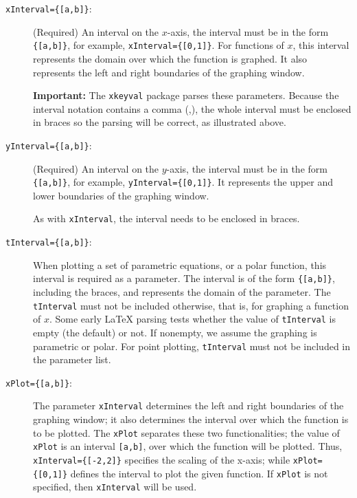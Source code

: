 \documentclass{article}
\def\darg#1{\{#1\}}
\begin{document}
\begin{description}
\begin{description}
    \item [\texttt{xInterval=\darg{[a,b]}}:] (Required) An interval on the $x$-axis, the
        interval must be in the form \verb!{[a,b]}!, for example,
        \texttt{xInterval=\darg{[0,1]}}. For functions of $x$, this interval
        represents the domain over which the function is graphed. It
        also represents the left and right boundaries of the graphing
        window.

        \textbf{Important:} The \texttt{xkeyval} package
        parses these parameters. Because the interval notation
        contains a comma (,), the whole interval must be enclosed in
        braces so the parsing will be correct, as illustrated above.

    \item [\texttt{yInterval=\darg{[a,b]}}:] (Required) An interval on the $y$-axis, the
        interval must be in the form \verb!{[a,b]}!, for
        example, \verb!yInterval={[0,1]}!. It represents
        the upper and lower boundaries of the graphing window.

        As with \texttt{xInterval}, the interval needs to be
        enclosed in braces.

    \item [\texttt{tInterval=\darg{[a,b]}}:] When plotting a set of parametric equations, or
        a polar function, this interval is required as a parameter. The
        interval is of the form \verb!{[a,b]}!, including the braces,
        and represents the domain of the parameter. The
        \texttt{tInterval} must not be included otherwise, that is, for
        graphing a function of $x$. Some early {\LaTeX} parsing tests
        whether the value of \texttt{tInterval} is empty (the default)
        or not. If nonempty, we assume the graphing is parametric or
        polar. For point plotting, \texttt{tInterval} must not be
        included in the parameter list.

    \item [\texttt{xPlot=\darg{[a,b]}}:] The parameter \texttt{xInterval} determines
        the left and right boundaries of the graphing window; it also
        determines the interval over which the function is to be plotted.
        The \texttt{xPlot} separates these two functionalities; the value
        of \texttt{xPlot} is an interval \verb![a,b]!, over which the
        function will be plotted. Thus, \verb!xInterval={[-2,2]}! specifies
        the scaling of the x-axis; while \verb!xPlot={[0,1]}! defines
        the interval to plot the given function. If \texttt{xPlot} is not
        specified, then \texttt{xInterval} will be used.


\end{description}
\end{description}
\end{document}
